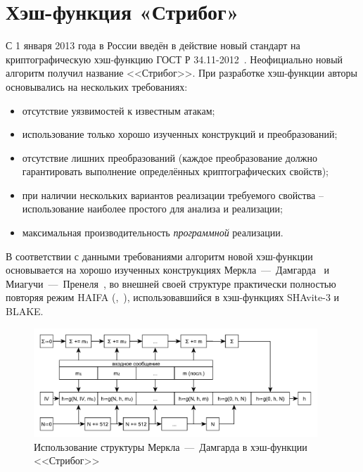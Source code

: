 \section{Хэш-функция «Стрибог»}\label{section-stribog}

С 1 января 2013 года в России введён в действие новый стандарт на криптографическую хэш-функцию ГОСТ Р 34.11-2012~\cite{GOST-R:34.11-2012}. Неофициально новый алгоритм получил название <<Стрибог>>. При разработке хэш-функции авторы основывались на нескольких требованиях:

\begin{itemize}
	\item отсутствие уязвимостей к известным атакам;
	\item использование только хорошо изученных конструкций и преобразований;
	\item отсутствие лишних преобразований (каждое преобразование должно гарантировать выполнение определённых криптографических свойств);
	\item при наличии нескольких вариантов реализации требуемого свойства -- использование наиболее простого для анализа и реализации;
	\item максимальная производительность \emph{программной} реализации.
\end{itemize}

В соответствии с данными требованиями алгоритм новой хэш-функции основывается на хорошо изученных конструкциях Меркла~---~Дамгарда~\cite{Merkle:1979, Merkle:1990, Damgard:1990} и Миагучи~---~Пренеля~\cite{Espen:Mieghem:1989, Miyaguchi:Ohta:Iwata:1990:03, Miyaguchi:Ohta:Iwata:1990:11}, во внешней своей структуре практически полностью повторяя режим HAIFA (,~\cite{Biham:Dunkelman:2007}), использовавшийся в хэш-функциях SHAvite-3 и BLAKE.

\begin{figure}[htb]
	\centering
	\includegraphics[width=0.95\textwidth]{pic/stribog-md}
  \caption{Использование структуры Меркла~---~Дамгарда в хэш-функции <<Стрибог>>}
  \label{fig:stribog-md}
\end{figure}

